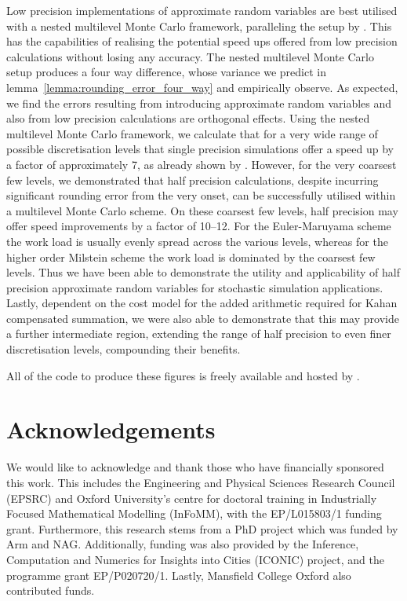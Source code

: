 \documentclass[manuscript,review]{acmart}
\begin{document}
Low precision implementations of approximate random variables are best utilised with a nested multilevel Monte Carlo framework, paralleling the setup by \citet{giles2020approximating}. This has the capabilities of realising the potential speed ups offered from low precision calculations without losing any accuracy. The nested multilevel Monte Carlo setup produces a four way difference, whose variance we predict in lemma~\ref{lemma:rounding_error_four_way} and empirically observe. As expected, we find the errors resulting from introducing approximate random variables and also from low precision calculations are orthogonal effects. Using the nested multilevel Monte Carlo framework, we calculate that for a very wide range of possible discretisation levels that single precision simulations offer a speed up by a factor of approximately 7, as already shown by \citet{giles2020approximating}. However, for the very coarsest few levels, we demonstrated that half precision calculations, despite incurring significant rounding error from the very onset, can be successfully utilised within a multilevel Monte Carlo scheme. On these coarsest few levels, half precision may offer speed improvements by a factor of 10--12. For the Euler-Maruyama scheme the work load is usually evenly spread across the various levels, whereas for the higher order Milstein scheme the work load is dominated by the coarsest few levels. Thus we have been able to demonstrate the utility and applicability of half precision approximate random variables for stochastic simulation applications. Lastly, dependent on the cost model for the added arithmetic required for Kahan compensated summation, we were also able to demonstrate that this may provide a further intermediate region, extending the range of half precision to even finer discretisation levels, compounding their benefits. 

All of the code to produce these figures is freely available and hosted by \citet{sheridan2020low_precision}. 

\section{Acknowledgements}
\label{sec:acknowledgements}

We would like to acknowledge and thank those who have financially sponsored this work. This includes the Engineering and Physical Sciences Research Council (EPSRC) and Oxford University's centre for doctoral training in Industrially Focused Mathematical Modelling (InFoMM), with the EP/L015803/1 funding grant. Furthermore, this research stems from a PhD project \citep{sheridan2020nested} which was funded by Arm and NAG. Additionally, funding was also provided by the Inference, Computation and Numerics for Insights into Cities (ICONIC) project, and the programme grant EP/P020720/1. Lastly, Mansfield College Oxford also contributed funds.  



\end{document}
